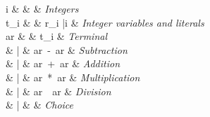 \begin{syntax}
  i & \in{} &  & \textit{Integers} \\
  t_{i} & \Coloneqq{} & r_{i} \quad|\quad i & \textit{Integer variables and literals} \\
  [1.5ex]

  ar & \Coloneqq{} & t_{i}    & \textit{Terminal} \\
  & | & ar\ -\ ar       & \textit{Subtraction} \\
  & | & ar\ +\ ar     & \textit{Addition} \\
  & | & ar\ *\ ar     & \textit{Multiplication} \\
  & | & ar\ \div\ ar     & \textit{Division} \\
  & | &  & \textit{Choice} \\
\end{syntax}